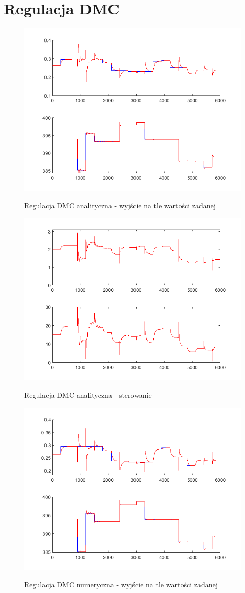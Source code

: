 \section{Regulacja DMC}
\begin{figure}[h!]
	\centering
	\includegraphics[width=.6\linewidth]{img/yDMC.png}
	\label{ch2:Zadanie}
	\caption{Regulacja DMC analityczna - wyjście na tle wartości zadanej}
\end{figure}
\begin{figure}[h!]
	\centering
	\includegraphics[width=.6\linewidth]{img/uDMC.png}
	\label{ch2:Zadanie}
	\caption{Regulacja DMC analityczna - sterowanie}
\end{figure}
\begin{figure}[h!]
	\centering
	\includegraphics[width=.6\linewidth]{img/yDMCnum.png}
	\label{ch2:Zadanie}
	\caption{Regulacja DMC numeryczna - wyjście na tle wartości zadanej}
\end{figure}
